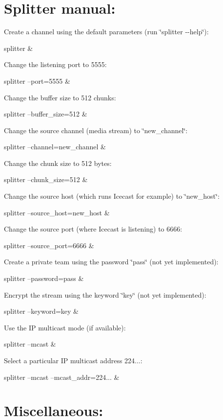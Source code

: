 \section*{Splitter manual\+:}


\begin{DoxyEnumerate}
\item Create a channel using the default parameters (run \char`\"{}splitter -\/-\/help\char`\"{})\+:

splitter \&
\item Change the listening port to 5555\+:

splitter --port=5555 \&
\item Change the buffer size to 512 chunks\+:

splitter --buffer\+\_\+size=512 \&
\item Change the source channel (media stream) to \char`\"{}new\+\_\+channel\char`\"{}\+:

splitter --channel=new\+\_\+channel \&
\item Change the chunk size to 512 bytes\+:

splitter --chunk\+\_\+size=512 \&
\item Change the source host (which runs Icecast for example) to \char`\"{}new\+\_\+host\char`\"{}\+:

splitter --source\+\_\+host=new\+\_\+host \&
\item Change the source port (where Icecast is listening) to 6666\+:

splitter --source\+\_\+port=6666 \&
\item Create a private team using the password \char`\"{}pass\char`\"{} (not yet implemented)\+:

splitter --password=pass \&
\item Encrypt the stream using the keyword \char`\"{}key\char`\"{} (not yet implemented)\+:

splitter --keyword=key \&
\item Use the I\+P multicast mode (if available)\+:

splitter --mcast \&
\item Select a particular I\+P multicast address 224...\+:

splitter --mcast --mcast\+\_\+addr=224... \&
\end{DoxyEnumerate}

\section*{Miscellaneous\+:}



